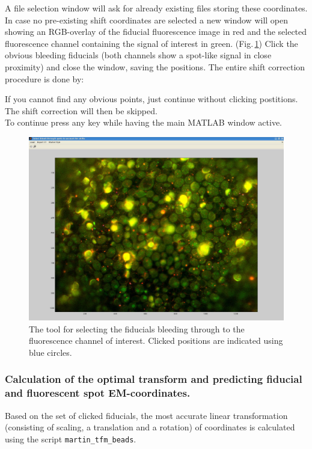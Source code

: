 \documentclass[10pt,a4paper,onepage,DIV12]{scrartcl}
\begin{document}
A file selection window will ask for already existing files storing these coordinates.\\

In case no pre-existing shift coordinates are selected a new window will open showing an RGB-overlay of the fiducial fluorescence image in red and the selected fluorescence channel containing the signal of interest in green. (Fig.\,\ref{fig:digitize})
Click the obvious bleeding fiducials (both channels show a spot-like signal in close proximity) and close the window, saving the positions. The entire shift correction procedure is done by:

If you cannot find any obvious points, just continue without clicking postitions. The shift correction will then be skipped.\\

To continue press any key while having the main MATLAB window active.\\

\begin{figure}
 \centering
 \includegraphics[width=.75\textwidth]{images/digitize.jpg}
 \caption{The tool for selecting the fiducials bleeding through to the fluorescence channel of interest. Clicked positions are indicated using blue circles.}
 \label{fig:digitize}
\end{figure}

\subsubsection{Calculation of the optimal transform and predicting fiducial and fluorescent spot EM-coordinates.}
Based on the set of clicked fiducials, the most accurate linear transformation (consisting of scaling, a translation and a rotation) of coordinates is calculated using the script \texttt{martin\_tfm\_beads}.

\end{document}
